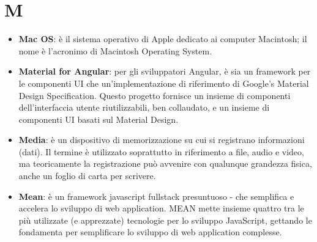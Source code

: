 \section{M}
\begin{itemize} 
	\item
	\textbf{Mac OS}: è il sistema operativo di Apple dedicato ai computer Macintosh; il nome è l'acronimo di Macintosh Operating System.
	\item
	\textbf{Material for Angular}: per gli sviluppatori Angular, è sia un framework per le componenti UI che un'implementazione di riferimento di Google's Material Design Specification. Questo progetto fornisce un insieme di componenti dell'interfaccia utente riutilizzabili, ben collaudato, e un insieme di componenti UI basati sul Material Design.
	\item
	\textbf{Media}: è un dispositivo di memorizzazione su cui si registrano informazioni (dati). Il termine è utilizzato soprattutto in riferimento a file, audio e video, ma teoricamente la registrazione può avvenire con qualunque grandezza fisica, anche un foglio di carta per scrivere.
	\item
	\textbf{Mean}: è un framework javascript fullstack presuntuoso - che semplifica e accelera lo sviluppo di web application. MEAN mette insieme quattro tra le più utilizzate (e apprezzate) tecnologie per lo sviluppo JavaScript, gettando le fondamenta per semplificare lo sviluppo di web application complesse.
	

\end{itemize}
